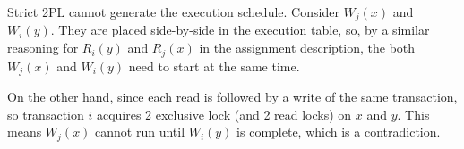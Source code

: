 Strict 2PL cannot generate the execution schedule.
Consider $W_j(x)$ and $W_i(y)$.
They are placed side-by-side in the execution table, so, by a similar reasoning for $R_i(y)$ and $R_j(x)$ in the assignment description,  the both $W_j(x)$ and $W_i(y)$ need to start at the same time.

On the other hand, since each read is followed by a write of the same transaction, so transaction $i$ acquires 2 exclusive lock (and 2 read locks) on $x$ and $y$.
This means $W_j(x)$ cannot run until $W_i(y)$ is complete, which is a contradiction.

